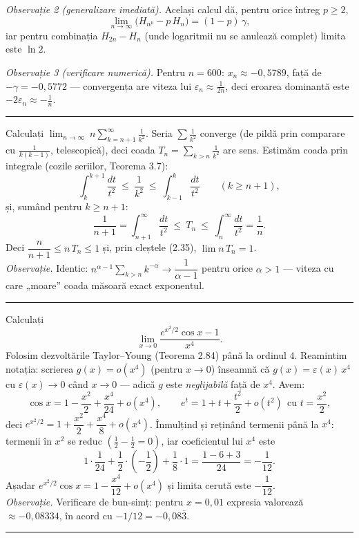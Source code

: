 \emph{Observație 2 (generalizare imediată).} Același calcul dă, pentru orice întreg $p\ge2$,
\[ \lim_{n\to\infty}\bigl(H_{n^{p}}-p\,H_{n}\bigr)=(1-p)\,\gamma , \]
iar pentru combinația $H_{2n}-H_{n}$ (unde logaritmii nu se anulează complet) limita este $\ln 2$.

\emph{Observație 3 (verificare numerică).} Pentru $n=600$: $x_{n}\approx-0{,}5789$, față de $-\gamma=-0{,}5772$ --- convergența are viteza lui $\varepsilon_{n}\approx\frac{1}{2n}$, deci eroarea dominantă este $-2\varepsilon_{n}\approx-\frac1n$.
\vspace{1mm}\hrule

Calculați $\displaystyle\lim_{n\to\infty}\ n\sum_{k=n+1}^{\infty}\frac1{k^2}$.
\sol Seria $\sum\frac1{k^2}$ converge (de pildă prin comparare cu $\frac1{k(k-1)}$, telescopică), deci coada $T_n=\sum_{k>n}\frac1{k^2}$ are sens. Estimăm coada prin integrale (cozile seriilor, Teorema 3.7):
\[ \int_k^{k+1}\frac{dt}{t^2}\ \le\ \frac1{k^2}\ \le\ \int_{k-1}^{k}\frac{dt}{t^2}\qquad(k\ge n+1), \]
și, sumând pentru $k\ge n+1$:
\[ \frac1{n+1}=\int_{n+1}^\infty\frac{dt}{t^2}\ \le\ T_n\ \le\ \int_n^\infty\frac{dt}{t^2}=\frac1n . \]
Deci $\dfrac{n}{n+1}\le n\,T_n\le1$ și, prin cleștele (2.35), $\lim n\,T_n=1$.\\[2pt]
\emph{Observație.} Identic: $n^{\alpha-1}\sum_{k>n}k^{-\alpha}\to\dfrac1{\alpha-1}$ pentru orice $\alpha>1$ --- viteza cu care „moare'' coada măsoară exact exponentul.
\vspace{1mm}\hrule

Calculați
\[ \lim_{x\to0}\frac{e^{x^2/2}\cos x-1}{x^4} . \]
\sol Folosim dezvoltările Taylor--Young (Teorema 2.84) până la ordinul $4$. Reamintim notația: scrierea $g(x)=o(x^{4})$ (pentru $x\to0$) înseamnă că $g(x)=\varepsilon(x)\,x^{4}$ cu $\varepsilon(x)\to0$ când $x\to0$ --- adică $g$ este \emph{neglijabilă} față de $x^{4}$. Avem:
\[ \cos x=1-\frac{x^2}{2}+\frac{x^4}{24}+o(x^4),\qquad e^{t}=1+t+\frac{t^2}{2}+o(t^2)\ \ \text{cu }t=\frac{x^2}{2}, \]
deci $e^{x^2/2}=1+\dfrac{x^2}{2}+\dfrac{x^4}{8}+o(x^4)$. Înmulțind și reținând termenii până la $x^4$: termenii în $x^2$ se reduc $\left(\frac12-\frac12=0\right)$, iar coeficientul lui $x^4$ este
\[ 1\cdot\frac1{24}+\frac12\cdot\left(-\frac12\right)+\frac18\cdot1=\frac{1-6+3}{24}=-\frac1{12} . \]
Așadar $e^{x^2/2}\cos x=1-\dfrac{x^4}{12}+o(x^4)$ și limita cerută este $-\dfrac1{12}$.\\[2pt]
\emph{Observație.} Verificare de bun-simț: pentru $x=0{,}01$ expresia valorează $\approx-0{,}08334$, în acord cu $-1/12=-0{,}08\overline{3}$.
\vspace{1mm}\hrule

